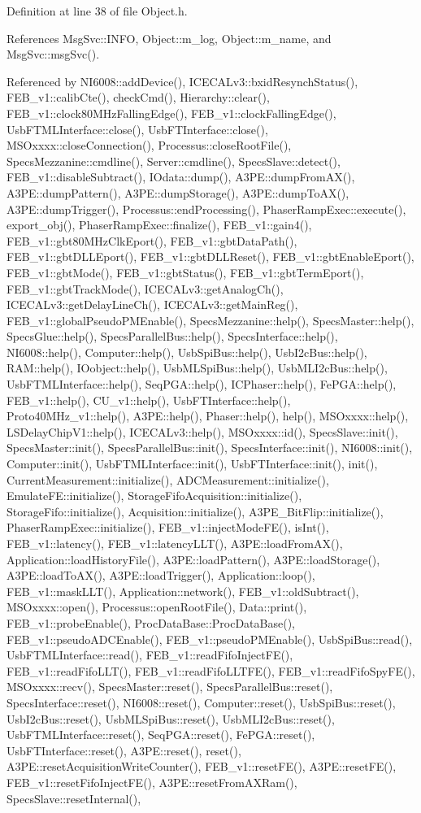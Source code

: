 Definition at line 38 of file Object.h.

References MsgSvc::INFO, Object::m\_\-log, Object::m\_\-name, and MsgSvc::msgSvc().

Referenced by NI6008::addDevice(), ICECALv3::bxidResynchStatus(), FEB\_\-v1::calibCte(), checkCmd(), Hierarchy::clear(), FEB\_\-v1::clock80MHzFallingEdge(), FEB\_\-v1::clockFallingEdge(), UsbFTMLInterface::close(), UsbFTInterface::close(), MSOxxxx::closeConnection(), Processus::closeRootFile(), SpecsMezzanine::cmdline(), Server::cmdline(), SpecsSlave::detect(), FEB\_\-v1::disableSubtract(), IOdata::dump(), A3PE::dumpFromAX(), A3PE::dumpPattern(), A3PE::dumpStorage(), A3PE::dumpToAX(), A3PE::dumpTrigger(), Processus::endProcessing(), PhaserRampExec::execute(), export\_\-obj(), PhaserRampExec::finalize(), FEB\_\-v1::gain4(), FEB\_\-v1::gbt80MHzClkEport(), FEB\_\-v1::gbtDataPath(), FEB\_\-v1::gbtDLLEport(), FEB\_\-v1::gbtDLLReset(), FEB\_\-v1::gbtEnableEport(), FEB\_\-v1::gbtMode(), FEB\_\-v1::gbtStatus(), FEB\_\-v1::gbtTermEport(), FEB\_\-v1::gbtTrackMode(), ICECALv3::getAnalogCh(), ICECALv3::getDelayLineCh(), ICECALv3::getMainReg(), FEB\_\-v1::globalPseudoPMEnable(), SpecsMezzanine::help(), SpecsMaster::help(), SpecsGlue::help(), SpecsParallelBus::help(), SpecsInterface::help(), NI6008::help(), Computer::help(), UsbSpiBus::help(), UsbI2cBus::help(), RAM::help(), IOobject::help(), UsbMLSpiBus::help(), UsbMLI2cBus::help(), UsbFTMLInterface::help(), SeqPGA::help(), ICPhaser::help(), FePGA::help(), FEB\_\-v1::help(), CU\_\-v1::help(), UsbFTInterface::help(), Proto40MHz\_\-v1::help(), A3PE::help(), Phaser::help(), help(), MSOxxxx::help(), LSDelayChipV1::help(), ICECALv3::help(), MSOxxxx::id(), SpecsSlave::init(), SpecsMaster::init(), SpecsParallelBus::init(), SpecsInterface::init(), NI6008::init(), Computer::init(), UsbFTMLInterface::init(), UsbFTInterface::init(), init(), CurrentMeasurement::initialize(), ADCMeasurement::initialize(), EmulateFE::initialize(), StorageFifoAcquisition::initialize(), StorageFifo::initialize(), Acquisition::initialize(), A3PE\_\-BitFlip::initialize(), PhaserRampExec::initialize(), FEB\_\-v1::injectModeFE(), isInt(), FEB\_\-v1::latency(), FEB\_\-v1::latencyLLT(), A3PE::loadFromAX(), Application::loadHistoryFile(), A3PE::loadPattern(), A3PE::loadStorage(), A3PE::loadToAX(), A3PE::loadTrigger(), Application::loop(), FEB\_\-v1::maskLLT(), Application::network(), FEB\_\-v1::oldSubtract(), MSOxxxx::open(), Processus::openRootFile(), Data::print(), FEB\_\-v1::probeEnable(), ProcDataBase::ProcDataBase(), FEB\_\-v1::pseudoADCEnable(), FEB\_\-v1::pseudoPMEnable(), UsbSpiBus::read(), UsbFTMLInterface::read(), FEB\_\-v1::readFifoInjectFE(), FEB\_\-v1::readFifoLLT(), FEB\_\-v1::readFifoLLTFE(), FEB\_\-v1::readFifoSpyFE(), MSOxxxx::recv(), SpecsMaster::reset(), SpecsParallelBus::reset(), SpecsInterface::reset(), NI6008::reset(), Computer::reset(), UsbSpiBus::reset(), UsbI2cBus::reset(), UsbMLSpiBus::reset(), UsbMLI2cBus::reset(), UsbFTMLInterface::reset(), SeqPGA::reset(), FePGA::reset(), UsbFTInterface::reset(), A3PE::reset(), reset(), A3PE::resetAcquisitionWriteCounter(), FEB\_\-v1::resetFE(), A3PE::resetFE(), FEB\_\-v1::resetFifoInjectFE(), A3PE::resetFromAXRam(), SpecsSlave::resetInternal(), 